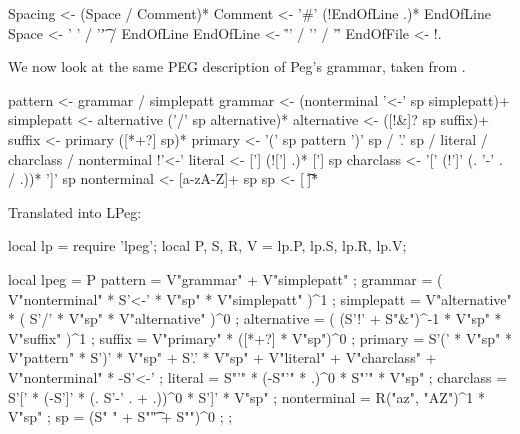 Spacing    <- (Space / Comment)*
Comment    <- ’#’ (!EndOfLine .)* EndOfLine
Space      <- ’ ’ / ’\t’ / EndOfLine
EndOfLine  <- ’\r\n’ / ’\n’ / ’\r’
EndOfFile  <- !.
\stoptyping

We now look at the same PEG description of Peg's grammar, taken from 
\cite{ierusalimschy2008lpegArticle}. 

\starttyping
pattern     <- grammar / simplepatt
grammar     <- (nonterminal ’<-’ sp simplepatt)+
simplepatt  <- alternative (’/’ sp alternative)*
alternative <- ([!&]? sp suffix)+
suffix      <- primary ([*+?] sp)*
primary     <- 
  ’(’ sp pattern ’)’ sp / ’.’ sp / literal /
  charclass / nonterminal !’<-’
literal     <- [’] (![’] .)* [’] sp
charclass   <- ’[’ (!’]’ (. ’-’ . / .))* ’]’ sp
nonterminal <- [a-zA-Z]+ sp
sp          <- [ \t\n]*
\stoptyping

Translated into LPeg:

\starttyping
local lp = require 'lpeg';
local P, S, R, V = lp.P, lp.S, lp.R, lp.V;

local lpeg = P {
  pattern     = V"grammar" + V"simplepatt" ;
  grammar     = ( V"nonterminal" * S’<-’ * V"sp" * V"simplepatt" )^1 ;
  simplepatt  = V"alternative" * ( S’/’ * V"sp" * V"alternative" )^0 ;
  alternative = ( (S'!' + S"&")^-1 * V"sp" * V"suffix" )^1 ;
  suffix      = V"primary" * ([*+?] * V"sp")^0 ;
  primary     = 
    S’(’ * V"sp" * V"pattern" * S’)’ * V"sp" +
    S’.’ * V"sp" +
    V"literal" +
    V"charclass" +
    V"nonterminal" * -S’<-’ ;
  literal     = S"’" * (-S"’" * .)^0 * S"’" * V"sp" ;
  charclass   = S’[’ * (-S']' * (. S’-’ . + .))^0 * S’]’ * V"sp" ;
  nonterminal = R("az", "AZ")^1 * V"sp" ;
  sp          = (S" " + S"\t" + S"\n")^0 ;
};
\stoptyping
